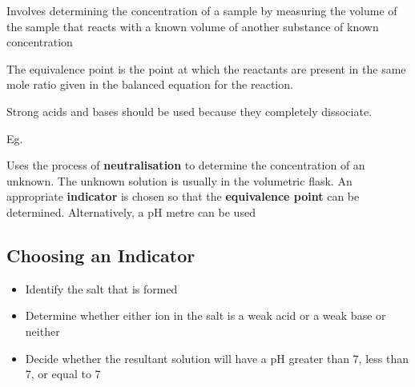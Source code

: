 	Involves determining the concentration of a sample by measuring the volume of the sample that reacts with a known volume of another substance of known concentration

	The equivalence point is the point at which the reactants are present in the same mole ratio given in the balanced equation for the reaction.

	Strong acids and bases should be used because they completely dissociate.

	Eg.

	\begin{center}
	\end{center}

	Uses the process of \textbf{neutralisation} to determine the concentration of an unknown. The unknown solution is usually in the volumetric flask. An appropriate \textbf{indicator} is chosen so that the \textbf{equivalence point} can be determined. Alternatively, a pH metre can be used

	\subsection{Choosing an Indicator}
	
		\begin{itemize}
			\item Identify the salt that is formed
			\item Determine whether either ion in the salt is a weak acid or a weak base or neither
			\item Decide whether the resultant solution will have a pH greater than 7, less than 7, or equal to 7
		\end{itemize}
